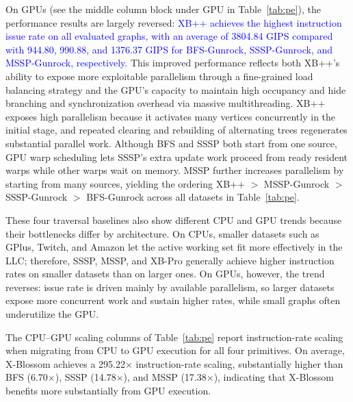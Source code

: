 
\label{para:inst_gpu}
On GPUs (see the middle column block under GPU in Table~\ref{tab:pe}), the performance results are largely reversed: 
\textcolor{blue}{XB++ achieves the highest instruction issue rate on all evaluated graphs, with an average of 3804.84 GIPS compared with 944.80, 990.88, and 1376.37 GIPS for BFS-Gunrock, SSSP-Gunrock, and MSSP-Gunrock, respectively.}
This improved performance reflects both XB++'s ability to expose more exploitable parallelism through a fine-grained load balancing strategy and the GPU's capacity to maintain high occupancy and hide branching and synchronization overhead via massive multithreading. 
XB++ exposes high parallelism because it activates many vertices concurrently in the initial stage, and repeated clearing and rebuilding of alternating trees regenerates substantial parallel work.
Although BFS and SSSP both start from one source, GPU warp scheduling lets SSSP's extra update work proceed from ready resident warps while other warps wait on memory.
MSSP further increases parallelism by starting from many sources, yielding the ordering XB++ $>$ MSSP-Gunrock $>$ SSSP-Gunrock $>$ BFS-Gunrock across all datasets in Table~\ref{tab:pe}.

These four traversal baselines also show different CPU and GPU trends because their bottlenecks differ by architecture.
On CPUs, smaller datasets such as GPlus, Twitch, and Amazon let the active working set fit more effectively in the LLC; therefore, SSSP, MSSP, and XB-Pro generally achieve higher instruction rates on smaller datasets than on larger ones.
On GPUs, however, the trend reverses: issue rate is driven mainly by available parallelism,
so larger datasets expose more concurrent work and sustain higher rates, while small graphs often underutilize the GPU.

The CPU--GPU scaling columns of Table~\ref{tab:pe} report instruction-rate scaling when migrating from CPU to GPU execution for all four primitives. 
On average, X-Blossom achieves a 295.22$\times$ instruction-rate scaling, substantially higher than BFS (6.70$\times$), SSSP (14.78$\times$), and MSSP (17.38$\times$), indicating that X-Blossom benefits more substantially from GPU execution.

